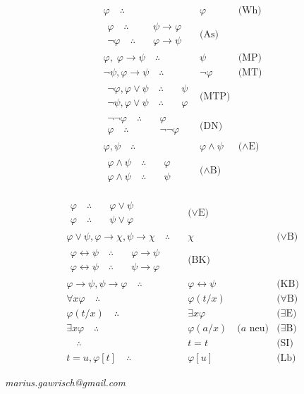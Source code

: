 \documentclass{scrartcl}
\renewcommand{\phi}{\varphi}
\newcommand{\pfeil}{\rightarrow}
\newcommand{\sss}[1]{\begin{split}#1\end{split}}
\newcommand{\tf}{\quad\therefore\quad &}
\begin{document}
\begin{minipage}[b]{0.5\linewidth}
\begin{align*}
\phi \tf \phi &\text{(Wh)} \\
\sss{\phi \tf \psi\pfeil\phi \\ \neg\phi \tf \phi\pfeil\psi} &\text{(As)} \\
\phi,\; \phi\pfeil\psi \tf \psi &\text{(MP)} \\
\neg\psi, \phi\pfeil\psi \tf \neg\phi &\text{(MT)} \\
\sss{\neg\phi, \phi\lor\psi \tf \psi \\ \neg\psi, \phi\lor\psi \tf \phi} &\text{(MTP)} \\
\sss{\neg\neg\phi \tf \phi \\ \phi \tf \neg\neg\phi} &\text{(DN)} \\
\phi, \psi \tf \phi\land\psi &\text{($\land$E)} \\
\sss{\phi\land\psi \tf \phi \\ \phi\land\psi \tf \psi} &\text{($\land$B)}
\end{align*}
\end{minipage}
\begin{minipage}[b]{0.5\linewidth}
\begin{align*}
\sss{\phi \tf \phi\lor\psi \\ \phi \tf \psi\lor\phi} &\text{($\lor$E)} \\
\phi\lor\psi, \phi\pfeil\chi, \psi\pfeil\chi \tf \chi &\text{($\lor$B)} \\
\sss{\phi\leftrightarrow\psi \tf \phi\pfeil\psi \\ \phi\leftrightarrow\psi \tf \psi\pfeil\phi} &\text{(BK)} \\
\phi\pfeil\psi, \psi\pfeil\phi \tf \phi\leftrightarrow\psi &\text{(KB)} \\
\forall x \phi \tf \phi(t/x) &\text{($\forall$B)} \\
\phi(t/x) \tf \exists x \phi &\text{($\exists$E)} \\
\exists x \phi \tf \phi(a/x) \quad\text{($a$ neu)} &\text{($\exists$B)} \\
\tf t=t &\text{(SI)} \\
t=u, \phi[t] \tf \phi[u] &\text{(Lb)}
\end{align*}
\end{minipage}

\vfill
\begin{center}\begin{footnotesize}\emph{marius.gawrisch@gmail.com}\end{footnotesize}\end{center}
\end{document}
